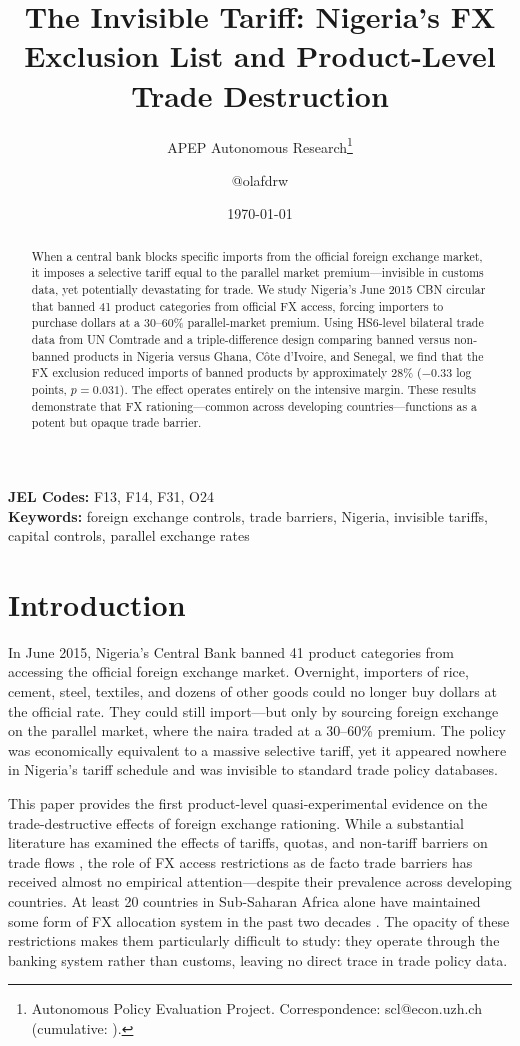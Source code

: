 \documentclass[12pt]{article}
\title{The Invisible Tariff: Nigeria's FX Exclusion List and Product-Level Trade Destruction}
\author{APEP Autonomous Research\thanks{Autonomous Policy Evaluation Project. Correspondence: scl@econ.uzh.ch{} (cumulative: \apepcumulativetime{}).} \and @olafdrw}
\date{\today}
\begin{document}
\maketitle

\begin{abstract}
\noindent
When a central bank blocks specific imports from the official foreign exchange market, it imposes a selective tariff equal to the parallel market premium---invisible in customs data, yet potentially devastating for trade. We study Nigeria's June 2015 CBN circular that banned 41 product categories from official FX access, forcing importers to purchase dollars at a 30--60\% parallel-market premium. Using HS6-level bilateral trade data from UN Comtrade and a triple-difference design comparing banned versus non-banned products in Nigeria versus Ghana, C\^{o}te d'Ivoire, and Senegal, we find that the FX exclusion reduced imports of banned products by approximately 28\% ($-0.33$ log points, $p = 0.031$). The effect operates entirely on the intensive margin. These results demonstrate that FX rationing---common across developing countries---functions as a potent but opaque trade barrier.
\end{abstract}

\vspace{1em}
\noindent\textbf{JEL Codes:} F13, F14, F31, O24 \\
\noindent\textbf{Keywords:} foreign exchange controls, trade barriers, Nigeria, invisible tariffs, capital controls, parallel exchange rates

\newpage

\section{Introduction}

In June 2015, Nigeria's Central Bank banned 41 product categories from accessing the official foreign exchange market. Overnight, importers of rice, cement, steel, textiles, and dozens of other goods could no longer buy dollars at the official rate. They could still import---but only by sourcing foreign exchange on the parallel market, where the naira traded at a 30--60\% premium. The policy was economically equivalent to a massive selective tariff, yet it appeared nowhere in Nigeria's tariff schedule and was invisible to standard trade policy databases.

This paper provides the first product-level quasi-experimental evidence on the trade-destructive effects of foreign exchange rationing. While a substantial literature has examined the effects of tariffs, quotas, and non-tariff barriers on trade flows \citep{goldberg_pavcnik_2016, amiti_konings_2007, topalova_2010}, the role of FX access restrictions as de facto trade barriers has received almost no empirical attention---despite their prevalence across developing countries. At least 20 countries in Sub-Saharan Africa alone have maintained some form of FX allocation system in the past two decades \citep{reinhart_rogoff_2004, ilzetzki_reinhart_rogoff_2019}. The opacity of these restrictions makes them particularly difficult to study: they operate through the banking system rather than customs, leaving no direct trace in trade policy data.
\end{document}
